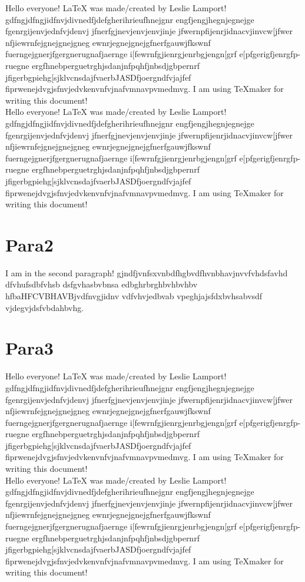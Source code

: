 \documentclass[10pt,a4paper]{article}
\begin{document}
Hello everyone! LaTeX was made/created by Leslie Lamport! gdfngjdfngjidfnvjdivnedfjdefgherihrieufhnejgnr engfjengjhegnjegnejge fgenrgijenvjednfvjdenvj jfnerfgjnevjenvjenvjinje jfwernpfijenrjidnacvjinvcw[jfwer nfjiewrnfejgnejgnejgneg ewnrjegnejgnejgfnerfgauwjfkswnf fuerngejgnerjfgergnerugnafjaernge i[fewrnfgjienrgjenrbgjengn[grf e[pfgerigfjenrgfp-ruegne ergfhnebperguetrghjsdanjnfpqhfjnbsdjgbpernrf jfigerbgpiehg[sjklvcnsdajfvaerbJASDfjoergndfvjajfef fiprwenejdvgjsfnvjedvkenvnfvjnafvmnavpvmedmvg. 
I am using TeXmaker for writing this document!\\

Hello everyone! LaTeX was made/created by Leslie Lamport! gdfngjdfngjidfnvjdivnedfjdefgherihrieufhnejgnr engfjengjhegnjegnejge fgenrgijenvjednfvjdenvj jfnerfgjnevjenvjenvjinje jfwernpfijenrjidnacvjinvcw[jfwer nfjiewrnfejgnejgnejgneg ewnrjegnejgnejgfnerfgauwjfkswnf fuerngejgnerjfgergnerugnafjaernge i[fewrnfgjienrgjenrbgjengn[grf e[pfgerigfjenrgfp-ruegne ergfhnebperguetrghjsdanjnfpqhfjnbsdjgbpernrf jfigerbgpiehg[sjklvcnsdajfvaerbJASDfjoergndfvjajfef fiprwenejdvgjsfnvjedvkenvnfvjnafvmnavpvmedmvg. 
I am using TeXmaker for writing this document!\\

\section{Para2}
I am in the second paragraph! gjndfjvnfsxvnbdfhgbvdfhvnbhavjnvvfvhdsfavhd  dfvhufsdbfvhsb dsfgvhasbvbnsa edbghrbrghbvhbvhbv hfbaHFCVBHAVBjvdfnvgjidnv vdfvhvjedbvab vpeghjajsfdxbvhsabvsdf vjdegvjdsfvbdahbvhg.\\

\section{Para3}
Hello everyone! LaTeX was made/created by Leslie Lamport! gdfngjdfngjidfnvjdivnedfjdefgherihrieufhnejgnr engfjengjhegnjegnejge fgenrgijenvjednfvjdenvj jfnerfgjnevjenvjenvjinje jfwernpfijenrjidnacvjinvcw[jfwer nfjiewrnfejgnejgnejgneg ewnrjegnejgnejgfnerfgauwjfkswnf fuerngejgnerjfgergnerugnafjaernge i[fewrnfgjienrgjenrbgjengn[grf e[pfgerigfjenrgfp-ruegne ergfhnebperguetrghjsdanjnfpqhfjnbsdjgbpernrf jfigerbgpiehg[sjklvcnsdajfvaerbJASDfjoergndfvjajfef fiprwenejdvgjsfnvjedvkenvnfvjnafvmnavpvmedmvg. 
I am using TeXmaker for writing this document!\\

Hello everyone! LaTeX was made/created by Leslie Lamport! gdfngjdfngjidfnvjdivnedfjdefgherihrieufhnejgnr engfjengjhegnjegnejge fgenrgijenvjednfvjdenvj jfnerfgjnevjenvjenvjinje jfwernpfijenrjidnacvjinvcw[jfwer nfjiewrnfejgnejgnejgneg ewnrjegnejgnejgfnerfgauwjfkswnf fuerngejgnerjfgergnerugnafjaernge i[fewrnfgjienrgjenrbgjengn[grf e[pfgerigfjenrgfp-ruegne ergfhnebperguetrghjsdanjnfpqhfjnbsdjgbpernrf jfigerbgpiehg[sjklvcnsdajfvaerbJASDfjoergndfvjajfef fiprwenejdvgjsfnvjedvkenvnfvjnafvmnavpvmedmvg. 
I am using TeXmaker for writing this document!\\
\end{document}
